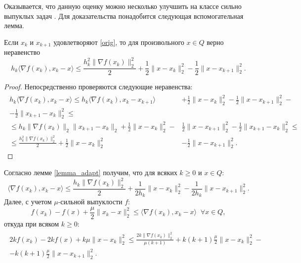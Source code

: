     Оказывается, что данную оценку можно несколько улучшить на классе сильно выпуклых задач \cite{Stonyakin_2021}. Для доказательства понадобится следующая вспомогательная лемма. 
    \begin{lemma}\label{lemma_adapt}
        Если $x_k$ и $x_{k+1}$ удовлетворяют \eqref{orig}, то для произвольного $x \in Q$ верно неравенство
        $$
            h_k \langle \nabla f(x_k), x_k - x \rangle \leq \frac{h^2_k \|\nabla f(x_k)\|^2_2}{2} + \frac{1}{2}\| x - x_k\|^2_2 - \frac{1}{2}\| x -x_{k+1}\|^2_2.
        $$
    \end{lemma}
    \begin{proof}
        Непосредственно проверяются следующие неравенства:
        \begin{gather*}
          \begin{aligned}
            h_k \langle \nabla f(x_k), x_k - x \rangle \leq h_k \langle \nabla f(x_k), x_k - x_{k+1} \rangle & + \frac{1}{2}\| x - x_k\|^2_2 -  \frac{1}{2}\| x - x_{k+1}\|^2_2 - \\
                - \frac{1}{2}\| x_{k+1} - x_k\|^2_2 \leq \\
            \leq h_k \|\nabla f(x_k)\|_2 \| x_{k+1} - x_{k} \|_2 + \frac{1}{2}\| x - x_k\|^2_2 -  &\frac{1}{2}\| x -x_{k+1}\|^2_2 - \frac{1}{2}\| x_{k+1} -x_k\|^2_2 \leq \\ 
            \leq \frac{h^2_k \|\nabla f(x_k)\|^2_2}{2} + \frac{1}{2}\| x - x_k\|^2_2& -  \frac{1}{2}\| x - x_{k+1}\|^2_2.
          \end{aligned}
        \end{gather*}
    \end{proof}
    Согласно лемме \ref{lemma_adapt} получим, что для всяких $k \geq 0$ и $x \in Q$: 
    $$
        \langle \nabla f(x_k), x_k - x \rangle \leq \frac{h_k \|\nabla f(x_k)\|^2_2}{2} + \frac{1}{2 h_k}\| x - x_k\|^2_2 - \frac{1}{2 h_k}\| x -x_{k+1}\|^2_2.
    $$
    Далее, с учетом $\mu$-сильной выпуклости $f$:
    $$
        f(x_k) - f(x)  + \frac{\mu}{2}\|x_k - x \|^2_2 \leq \langle \nabla f(x_k), x_k - x \rangle \;\; \forall x \in Q,
    $$
    откуда при всяком $k \geq 0$:
    \begin{gather*}
      \begin{aligned}
        2k f(x_k) - 2k f(x) + k\mu\|x - x_k \|^2_2 \leq \frac{2k\|\nabla f(x_k)\|^2_2}{\mu(k+1)} + k(k+1)\frac{\mu}{2}\|x - x_k\|^2_2 -\\
        - k(k+1)\frac{\mu}{2}\|x - x_{k+1}\|^2_2.
      \end{aligned}
    \end{gather*}

